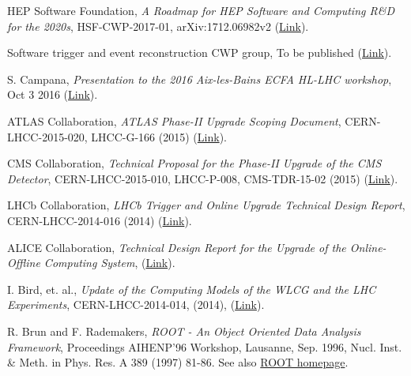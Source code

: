 \documentclass[11pt,letterpaper,fleqn]{article}
\begin{document}
\linenumbers
\thispagestyle{empty}


\newpage
\setcounter{page}{1}



%
%


\begin{thebibliography}{9}

HEP Software Foundation,
\textit{A Roadmap for HEP Software and Computing R\&D for the 2020s},
HSF-CWP-2017-01, arXiv:1712.06982v2 (\href{https://arxiv.org/abs/1712.06982}{Link}).

Software trigger and event reconstruction CWP group, To be published (\href{https://docs.google.com/document/d/1QRO8RA488fwfSg5CSjmvm16-pZpGApSA0l666g_mS_0}{Link}).

S. Campana,
\textit{Presentation to the 2016 Aix-les-Bains ECFA HL-LHC workshop},
Oct 3 2016 (\href{https://indico.cern.ch/event/524795/contributions/2236590/attachments/1347419/2032314/ECFA2016.pdf}{Link}).

 ATLAS Collaboration, \textit{ATLAS Phase-II Upgrade Scoping Document},
CERN-LHCC-2015-020, LHCC-G-166 (2015) (\href{https://cds.cern.ch/record/2055248}{Link}).

CMS Collaboration,
\textit{Technical Proposal for the Phase-II Upgrade of the CMS Detector}, 
CERN-LHCC-2015-010, LHCC-P-008, CMS-TDR-15-02 (2015) (\href{https://cds.cern.ch/record/2020886}{Link}). 

LHCb Collaboration, 
\textit{LHCb Trigger and Online Upgrade Technical Design Report},
CERN-LHCC-2014-016 (2014) (\href{https://cds.cern.ch/record/1701361}{Link}).

ALICE Collaboration, 
\textit{Technical Design Report for the Upgrade of the Online-Offline Computing System}, 
(\href{https://cds.cern.ch/record/2011297}{Link}).

I. Bird, et. al., 
\textit{Update of the Computing Models of the WLCG and the LHC Experiments},
CERN-LHCC-2014-014, (2014), (\href{http://cds.cern.ch/record/1695401/files/LCG-TDR-002.pdf}{Link}).


R. Brun and F. Rademakers,
\textit{ROOT - An Object Oriented Data Analysis Framework}, 
Proceedings AIHENP'96 Workshop, Lausanne, Sep. 1996, Nucl. Inst. \& Meth. in Phys. Res. A 389 (1997) 81-86. See also \href{http://root.cern.ch}{ROOT homepage}.



\end{thebibliography}
\end{document}
